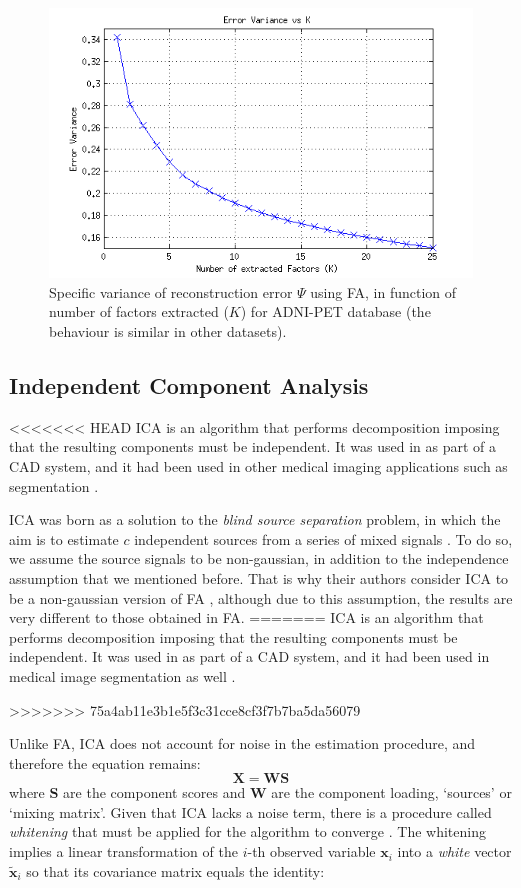 \begin{figure}[ht]
	\centering
	\includegraphics[width=0.5\linewidth]{Graphics/ch4/varError-K-ADNI}
	\caption[Variance of reconstruction error in \ac{FA}.]{Specific variance of reconstruction error $\Psi$ using \ac{FA}, in function of number of factors extracted ($K$) for ADNI-PET database (the behaviour is similar in other datasets).}
	\label{fig:error}
\end{figure}

\subsection{Independent Component Analysis}
<<<<<<< HEAD
\acf{ICA} \cite{Hyvarinen2000} is an algorithm that performs decomposition imposing that the resulting components must be independent. It was used in \cite{Alvarez2009,Martinez201141,Martinez-Murcia20129676} as part of a \ac{CAD} system, and it had been used in other medical imaging applications such as segmentation \cite{DeMartino2007}. 

\ac{ICA} was born as a solution to the \textit{blind source separation} problem, in which the aim is to estimate $c$ independent sources from a series of mixed signals \cite{Hyvarinen2000}. To do so, we assume the source signals to be non-gaussian, in addition to the independence assumption that we mentioned before. That is why their authors consider \ac{ICA} to be a non-gaussian version of \ac{FA} \cite{Hyvaerinen2003}, although due to this assumption, the results are very different to those obtained in \ac{FA}. 
=======
\acf{ICA} \cite{Hyvarinen2000} is an algorithm that performs decomposition imposing that the resulting components must be independent. It was used in \cite{Alvarez2009,Martinez201141,Martinez-Murcia20129676} as part of a \ac{CAD} system, and it had been used in medical image segmentation as well \cite{DeMartino2007}. 


>>>>>>> 75a4ab11e3b1e5f3c31cce8cf3f7b7ba5da56079

Unlike \ac{FA}, \ac{ICA} does not account for noise in the estimation procedure, and therefore the equation remains: 
\begin{equation}\label{eq:icaecuation}
\mathbf{X} = \mathbf{W}\mathbf{S}
\end{equation}
where $\mathbf{S}$ are the component scores and $\mathbf{W}$ are the component loading, `sources' or `mixing matrix'. Given that \ac{ICA} lacks a noise term, there is a procedure called \textit{whitening} that must be applied for the algorithm to converge \cite{Hyvarinen2000}. The whitening implies a linear transformation of the $i$-th observed variable $\mathbf{x}_i$ into a \textit{white} vector $\tilde{\mathbf{x}}_i$ so that its covariance matrix equals the identity: 

